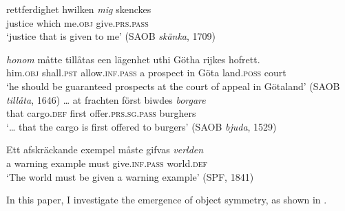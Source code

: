\documentclass[output=paper]{langscibook}
\begin{document}
\ea%
    \label{ex:falk:2}

\ea\label{ex:falk:2a}
\gll rettferdighet    hwilken \textit{mig} skenckes\\
      justice      which  me.\textsc{obj}  give.\textsc{prs.pass}\\
\glt ‘justice that is given to me’ (SAOB \textit{skänka}, 1709)

\ex\label{ex:falk:2b}
\gll      \textit{honom} måtte        tillåtas          een  lägenhet  uthi  Götha  rijkes      hofrett.\\
      him.\textsc{obj}  shall.\textsc{pst}    allow\textsc{.inf.pass}   a    prospect  in    Göta    land.\textsc{poss}  court\\
\glt     ‘he should be guaranteed prospects at the court of appeal in Götaland’ {(}{SAOB \textit{tillåta}, 1646)}
\ex\label{ex:falk:2c}
\gll … at  frachten    först  biwdes \textit{borgare}\\
         {} that  cargo.\textsc{def}  first  offer{\textsc{.prs.sg.pass}}    burghers\\
\glt ‘… that the cargo is first offered to burgers’ (SAOB \textit{bjuda}, 1529)

\ex\label{ex:falk:2d}
\gll Ett    afskräckande  exempel  måste    gifvas \textit{verlden}\\
      a      warning      example  must    give\textsc{.inf.pass}  world\textsc{.def}\\
\glt `The world must be given a warning example’ (SPF, 1841)
    \z
    \z

\noindent In this paper, I investigate the emergence of object symmetry, as shown in .
\end{document}
